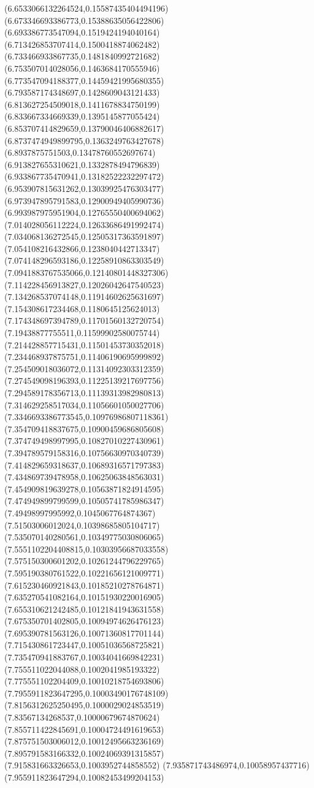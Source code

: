 {(6.6533066132264524,0.15587435404494196)
(6.673346693386773,0.15388635056422806)
(6.693386773547094,0.1519424194040164)
(6.713426853707414,0.1500418874062482)
(6.733466933867735,0.1481840992721682)
(6.753507014028056,0.1463684170555946)
(6.773547094188377,0.14459421995680355)
(6.793587174348697,0.1428609043121433)
(6.813627254509018,0.1411678834750199)
(6.833667334669339,0.1395145877055424)
(6.853707414829659,0.13790046406882617)
(6.8737474949899795,0.1363249763427678)
(6.8937875751503,0.13478760552697674)
(6.913827655310621,0.1332878494796839)
(6.933867735470941,0.13182522232297472)
(6.953907815631262,0.13039925476303477)
(6.973947895791583,0.12900949405990736)
(6.993987975951904,0.12765550400694062)
(7.014028056112224,0.12633686491992474)
(7.034068136272545,0.12505317363591897)
(7.054108216432866,0.1238040442713347)
(7.074148296593186,0.12258910863303549)
(7.0941883767535066,0.12140801448327306)
(7.114228456913827,0.12026042647540523)
(7.134268537074148,0.11914602625631697)
(7.154308617234468,0.1180645125624013)
(7.174348697394789,0.11701560132720754)
(7.19438877755511,0.11599902580075744)
(7.214428857715431,0.11501453730352018)
(7.234468937875751,0.11406190695999892)
(7.254509018036072,0.11314092303312359)
(7.274549098196393,0.11225139217697756)
(7.294589178356713,0.11139313982980813)
(7.314629258517034,0.11056601050027706)
(7.3346693386773545,0.10976986807118361)
(7.354709418837675,0.10900459686805608)
(7.374749498997995,0.10827010227430961)
(7.394789579158316,0.10756630970340739)
(7.414829659318637,0.10689316571797383)
(7.434869739478958,0.10625063848563031)
(7.454909819639278,0.10563871824914595)
(7.474949899799599,0.10505741785986347)
(7.49498997995992,0.1045067764874367)
(7.51503006012024,0.10398685805104717)
(7.535070140280561,0.10349775030806065)
(7.5551102204408815,0.10303956687033558)
(7.575150300601202,0.10261244796229765)
(7.595190380761522,0.10221656121009771)
(7.615230460921843,0.10185210278764871)
(7.635270541082164,0.10151930220016905)
(7.655310621242485,0.10121841943631558)
(7.675350701402805,0.10094974626476123)
(7.695390781563126,0.10071360817701144)
(7.715430861723447,0.10051036568725821)
(7.735470941883767,0.10034041669842231)
(7.755511022044088,0.1002041985193322)
(7.775551102204409,0.10010218754693806)
(7.7955911823647295,0.10003490176748109)
(7.8156312625250495,0.1000029024853519)
(7.83567134268537,0.10000679674870624)
(7.855711422845691,0.10004724491619653)
(7.875751503006012,0.10012495663236169)
(7.895791583166332,0.10024069391315857)
(7.915831663326653,0.1003952744858552)
(7.935871743486974,0.10058957437716)
(7.955911823647294,0.10082453499204153)
}
